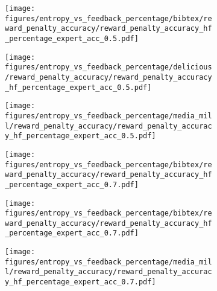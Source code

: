 \begin{figure}[t]
    \begin{subfigure}[b]{0.32\columnwidth}
        \centering
        \texttt{[image: figures/entropy\_vs\_feedback\_percentage/bibtex/reward\_penalty\_accuracy/reward\_penalty\_accuracy\_hf\_percentage\_expert\_acc\_0.5.pdf]}
    \end{subfigure}
    \hfill
    \begin{subfigure}[b]{0.32\columnwidth}
        \centering
        \texttt{[image: figures/entropy\_vs\_feedback\_percentage/delicious/reward\_penalty\_accuracy/reward\_penalty\_accuracy\_hf\_percentage\_expert\_acc\_0.5.pdf]}
    \end{subfigure}
    \hfill
    \begin{subfigure}[b]{0.32\columnwidth}
        \centering
        \texttt{[image: figures/entropy\_vs\_feedback\_percentage/media\_mill/reward\_penalty\_accuracy/reward\_penalty\_accuracy\_hf\_percentage\_expert\_acc\_0.5.pdf]}
    \end{subfigure}
    \hfill

    \begin{subfigure}[b]{0.32\columnwidth}
        \centering
        \texttt{[image: figures/entropy\_vs\_feedback\_percentage/bibtex/reward\_penalty\_accuracy/reward\_penalty\_accuracy\_hf\_percentage\_expert\_acc\_0.7.pdf]}
    \end{subfigure}
    \hfill
    \begin{subfigure}[b]{0.32\columnwidth}
        \centering
        \texttt{[image: figures/entropy\_vs\_feedback\_percentage/bibtex/reward\_penalty\_accuracy/reward\_penalty\_accuracy\_hf\_percentage\_expert\_acc\_0.7.pdf]}
    \end{subfigure}
    \hfill
    \begin{subfigure}[b]{0.32\columnwidth}
        \centering
        \texttt{[image: figures/entropy\_vs\_feedback\_percentage/media\_mill/reward\_penalty\_accuracy/reward\_penalty\_accuracy\_hf\_percentage\_expert\_acc\_0.7.pdf]}
    \end{subfigure}
    \hfill


\end{figure}
